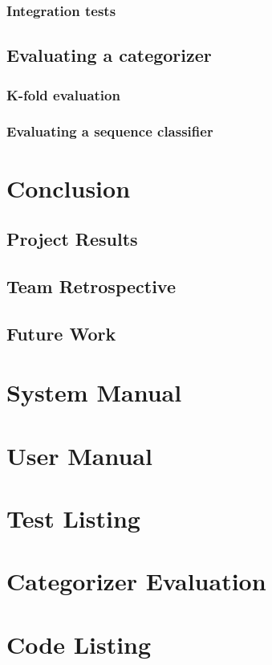 \documentclass[12pt, twoside, a4paper, draft]{report}
\begin{document}
\subsection{Integration tests}
\section{Evaluating a categorizer}
\subsection{K-fold evaluation}
\subsection{Evaluating a sequence classifier}

\chapter{Conclusion}
\section{Project Results}
\section{Team Retrospective}
\section{Future Work}

\appendix
\chapter{System Manual}
\chapter{User Manual}
\chapter{Test Listing}
\chapter{Categorizer Evaluation}
\chapter{Code Listing}
\end{document}
